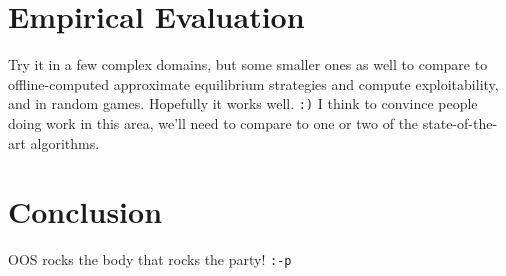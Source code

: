 \documentclass[letterpaper]{article}
\begin{document}
\section{Empirical Evaluation}

Try it in a few complex domains, but some smaller ones as well to compare to offline-computed approximate equilibrium strategies and compute exploitability, and in random games. 
Hopefully it works well. {\tt :)} I think to convince people doing work in this area, we'll need 
to compare to one or two of the state-of-the-art algorithms. 

\section{Conclusion}

OOS rocks the body that rocks the party! {\tt :-p}  




\end{document}

